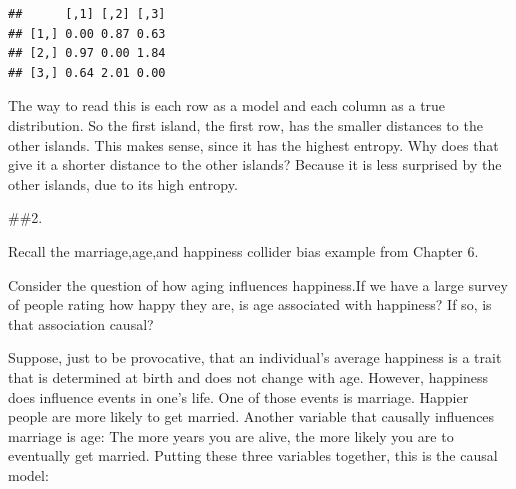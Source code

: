 \documentclass[
]{article}
\newenvironment{Shaded}{\begin{snugshade}}{\end{snugshade}}
\newcommand{\CommentTok}[1]{\textcolor[rgb]{0.56,0.35,0.01}{\textit{#1}}}
\newcommand{\ControlFlowTok}[1]{\textcolor[rgb]{0.13,0.29,0.53}{\textbf{#1}}}
\newcommand{\DataTypeTok}[1]{\textcolor[rgb]{0.13,0.29,0.53}{#1}}
\newcommand{\DecValTok}[1]{\textcolor[rgb]{0.00,0.00,0.81}{#1}}
\newcommand{\KeywordTok}[1]{\textcolor[rgb]{0.13,0.29,0.53}{\textbf{#1}}}
\newcommand{\NormalTok}[1]{#1}
\newcommand{\OperatorTok}[1]{\textcolor[rgb]{0.81,0.36,0.00}{\textbf{#1}}}
\newcommand{\OtherTok}[1]{\textcolor[rgb]{0.56,0.35,0.01}{#1}}
\newcommand{\StringTok}[1]{\textcolor[rgb]{0.31,0.60,0.02}{#1}}
\begin{document}
\begin{Shaded}
\end{Shaded}

\begin{verbatim}
##      [,1] [,2] [,3]
## [1,] 0.00 0.87 0.63
## [2,] 0.97 0.00 1.84
## [3,] 0.64 2.01 0.00
\end{verbatim}

The way to read this is each row as a model and each column as a true
distribution. So the first island, the first row, has the smaller
distances to the other islands. This makes sense, since it has the
highest entropy. Why does that give it a shorter distance to the other
islands? Because it is less surprised by the other islands, due to its
high entropy.

\#\#2.

Recall the marriage,age,and happiness collider bias example from Chapter
6.

Consider the question of how aging influences happiness.If we have a
large survey of people rating how happy they are, is age associated with
happiness? If so, is that association causal?

Suppose, just to be provocative, that an individual's average happiness
is a trait that is determined at birth and does not change with age.
However, happiness does influence events in one's life. One of those
events is marriage. Happier people are more likely to get married.
Another variable that causally influences marriage is age: The more
years you are alive, the more likely you are to eventually get married.
Putting these three variables together, this is the causal model:
\end{document}
